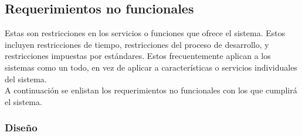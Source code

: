 \subsection{Requerimientos no funcionales}
	
	Estas son restricciones en los servicios o funciones que ofrece el sistema. Estos incluyen restricciones de tiempo, restricciones del proceso de desarrollo, y restricciones impuestas por estándares. Estos frecuentemente aplican a los sistemas como un todo, en vez de aplicar a características o servicios individuales del sistema. \\
	
	A continuación se enlistan los requerimientos no funcionales con los que cumplirá el sistema.
	
	\subsubsection{Diseño}
	
